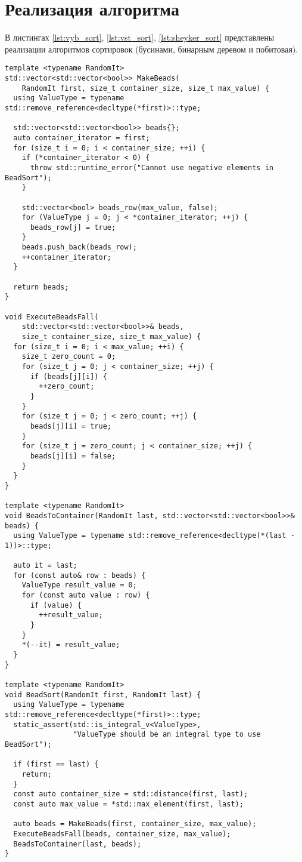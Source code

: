 \section{Реализация алгоритма}
В листингах \ref{lst:vyb_sort}, \ref{lst:vst_sort}, \ref{lst:sheyker_sort}
представлены реализации алгоритмов сортировок (бусинами, бинарным деревом и побитовая).

\begin{lstlisting}[label=lst:vyb_sort,caption=Алгоритм сортировки бусинами]
template <typename RandomIt>
std::vector<std::vector<bool>> MakeBeads(
    RandomIt first, size_t container_size, size_t max_value) {
  using ValueType = typename std::remove_reference<decltype(*first)>::type;

  std::vector<std::vector<bool>> beads{};
  auto container_iterator = first;
  for (size_t i = 0; i < container_size; ++i) {
    if (*container_iterator < 0) {
      throw std::runtime_error("Cannot use negative elements in BeadSort");
    }

    std::vector<bool> beads_row(max_value, false);
    for (ValueType j = 0; j < *container_iterator; ++j) {
      beads_row[j] = true;
    }
    beads.push_back(beads_row);
    ++container_iterator;
  }

  return beads;
}

void ExecuteBeadsFall(
    std::vector<std::vector<bool>>& beads,
    size_t container_size, size_t max_value) {
  for (size_t i = 0; i < max_value; ++i) {
    size_t zero_count = 0;
    for (size_t j = 0; j < container_size; ++j) {
      if (beads[j][i]) {
        ++zero_count;
      }
    }
    for (size_t j = 0; j < zero_count; ++j) {
      beads[j][i] = true;
    }
    for (size_t j = zero_count; j < container_size; ++j) {
      beads[j][i] = false;
    }
  }
}

template <typename RandomIt>
void BeadsToContainer(RandomIt last, std::vector<std::vector<bool>>& beads) {
  using ValueType = typename std::remove_reference<decltype(*(last - 1))>::type;

  auto it = last;
  for (const auto& row : beads) {
    ValueType result_value = 0;
    for (const auto value : row) {
      if (value) {
        ++result_value;
      }
    }
    *(--it) = result_value;
  }
}

template <typename RandomIt>
void BeadSort(RandomIt first, RandomIt last) {
  using ValueType = typename std::remove_reference<decltype(*first)>::type;
  static_assert(std::is_integral_v<ValueType>,
                "ValueType should be an integral type to use BeadSort");

  if (first == last) {
    return;
  }
  const auto container_size = std::distance(first, last);
  const auto max_value = *std::max_element(first, last);

  auto beads = MakeBeads(first, container_size, max_value);
  ExecuteBeadsFall(beads, container_size, max_value);
  BeadsToContainer(last, beads);
}
\end{lstlisting}


